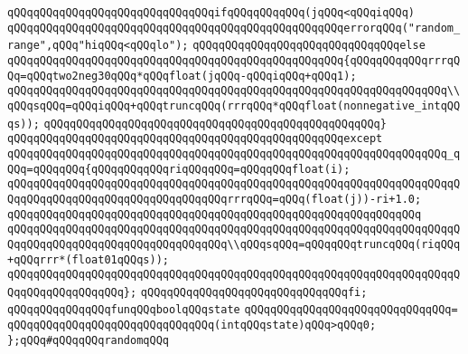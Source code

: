 \verb|qQQqqQQqqQQqqQQqqQQqqQQqqQQqqQQqifqQQqqQQqqQQq(jqQQq<qQQqiqQQq)|\newline
\verb|qQQqqQQqqQQqqQQqqQQqqQQqqQQqqQQqqQQqqQQqqQQqqQQqqQQqerrorqQQq("random_range",qQQq"hiqQQq<qQQqlo");|\newline
\verb|qQQqqQQqqQQqqQQqqQQqqQQqqQQqqQQqelse|\newline
\verb|qQQqqQQqqQQqqQQqqQQqqQQqqQQqqQQqqQQqqQQqqQQqqQQqqQQq{qQQqqQQqqQQqrrrqQQq=qQQqtwo2neg30qQQq*qQQqfloat(jqQQq-qQQqiqQQq+qQQq1);|\newline
\verb|qQQqqQQqqQQqqQQqqQQqqQQqqQQqqQQqqQQqqQQqqQQqqQQqqQQqqQQqqQQqqQQqqQQq\\qQQqsqQQq=qQQqiqQQq+qQQqtruncqQQq(rrrqQQq*qQQqfloat(nonnegative_intqQQqs));|\newline
\verb|qQQqqQQqqQQqqQQqqQQqqQQqqQQqqQQqqQQqqQQqqQQqqQQqqQQq}|\newline
\verb|qQQqqQQqqQQqqQQqqQQqqQQqqQQqqQQqqQQqqQQqqQQqqQQqqQQqexcept|\newline
\verb|qQQqqQQqqQQqqQQqqQQqqQQqqQQqqQQqqQQqqQQqqQQqqQQqqQQqqQQqqQQqqQQqqQQq_qQQq=qQQqqQQq{qQQqqQQqqQQqriqQQqqQQq=qQQqqQQqfloat(i);|\newline
\verb|qQQqqQQqqQQqqQQqqQQqqQQqqQQqqQQqqQQqqQQqqQQqqQQqqQQqqQQqqQQqqQQqqQQqqQQqqQQqqQQqqQQqqQQqqQQqqQQqqQQqqQQqrrrqQQq=qQQq(float(j))-ri+1.0;|\newline
\verb|qQQqqQQqqQQqqQQqqQQqqQQqqQQqqQQqqQQqqQQqqQQqqQQqqQQqqQQqqQQqqQQq|\newline
\verb|qQQqqQQqqQQqqQQqqQQqqQQqqQQqqQQqqQQqqQQqqQQqqQQqqQQqqQQqqQQqqQQqqQQqqQQqqQQqqQQqqQQqqQQqqQQqqQQqqQQqqQQq\\qQQqsqQQq=qQQqqQQqtruncqQQq(riqQQq+qQQqrrr*(float01qQQqs));|\newline
\verb|qQQqqQQqqQQqqQQqqQQqqQQqqQQqqQQqqQQqqQQqqQQqqQQqqQQqqQQqqQQqqQQqqQQqqQQqqQQqqQQqqQQqqQQq};|\newline
\verb|qQQqqQQqqQQqqQQqqQQqqQQqqQQqqQQqfi;|\newline
\newline
\newline
\verb|qQQqqQQqqQQqqQQqfunqQQqboolqQQqstate|\newline
\verb|qQQqqQQqqQQqqQQqqQQqqQQqqQQqqQQq=|\newline
\verb|qQQqqQQqqQQqqQQqqQQqqQQqqQQqqQQq(intqQQqstate)qQQq>qQQq0;|\newline
\newline
\verb|};qQQq#qQQqqQQqrandomqQQq|\newline
\newline
\newline

